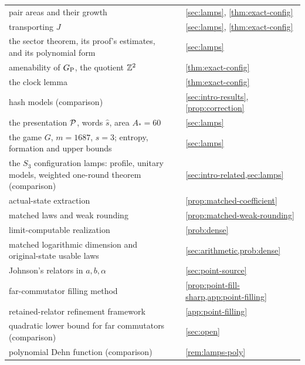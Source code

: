 {\begin{longtable}{@{}L{0.45\textwidth}L{0.21\textwidth}L{0.26\textwidth}@{}}
pair areas and their growth & \cite[Thm.~7.8, Rem.~7.10]{DM-game} & \cref{sec:lamps}, \cref{thm:exact-config}\\
transporting $J$ & \cite[Lemma~7.11]{DM-game} & \cref{sec:lamps}, \cref{thm:exact-config}\\
the sector theorem, its proof's estimates, and its polynomial form & \cite[Thm.~8.1, Rem.~8.3]{DM-game} & \cref{sec:lamps}\\
amenability of $G_{\mathrm P}$, the quotient $\mathbb Z^2$ & \cite[Prop.~6.8]{DM-game} & \cref{thm:exact-config}\\
the clock lemma & \cite[Lemma~9.3]{DM-game} & \cref{thm:exact-config}\\
hash models (comparison) & \cite[Prop.~9.4]{DM-game} & \cref{sec:intro-results}, \cref{prop:correction}\\
the presentation $\mathcal P$, words $\hat s$, area $A_*=60$ & \cite[Prop.~10.3]{DM-game} & \cref{sec:lamps}\\
the game $G$, $m=1687$, $s=3$; entropy, formation and upper bounds & \cite[Thm.~A, Thm.~10.5, Cor.~10.6]{DM-game} &
\cref{sec:lamps}\\
\midrule
the $S_3$ configuration lamps: profile, unitary models, weighted one-round theorem (comparison) & \cite[Thm.~A, Thm.~10.1]{DM-lamps} &
\cref{sec:intro-related,sec:lamps}\\
\midrule
actual-state extraction & \cite[Lemma~12.1]{DM-U3} & \cref{prop:matched-coefficient}\\
matched laws and weak rounding & \cite[Section~12]{DM-U3} & \cref{prop:matched-weak-rounding}\\
limit-computable realization & \cite[Theorem~1.1]{DM-U3} & \cref{prob:dense}\\
matched logarithmic dimension and original-state usable laws & \cite[Thm.~16.6, Cor.~16.7]{DM-U3} & \cref{sec:arithmetic,prob:dense}\\
\midrule
Johnson's relators in $a,b,\alpha$ & \cite[(1)]{DM-H3} & \cref{sec:point-source}\\
far-commutator filling method & \cite[Thm.~3.2, App.~A]{DM-H3} & \cref{prop:point-fill-sharp,app:point-filling}\\
retained-relator refinement framework & \cite[Rem.~A.3]{DM-H3} & \cref{app:point-filling}\\
quadratic lower bound for far commutators (comparison) & \cite[Prop.~3.4]{DM-H3} & \cref{sec:open}\\
polynomial Dehn function (comparison) & \cite[Thm.~3.3]{DM-H3} & \cref{rem:lamps-poly}\\

\end{longtable}}
